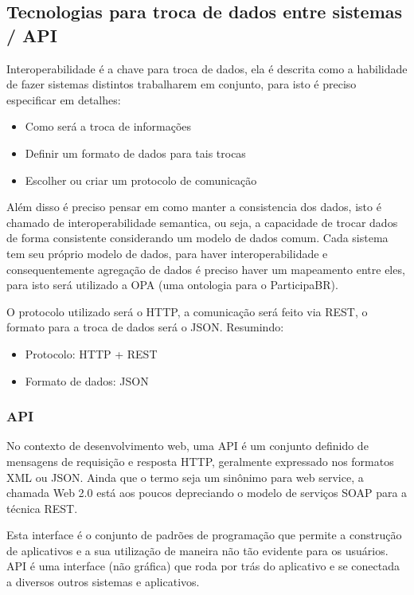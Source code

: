\documentclass[12pt]{article}
\begin{document}
\subsection{Tecnologias para troca de dados entre sistemas / API}

Interoperabilidade é a chave para troca de dados, ela é descrita como a
habilidade de fazer sistemas distintos trabalharem em conjunto, para isto é
preciso especificar em detalhes:

\begin{itemize}
  \item Como será a troca de informações
  \item Definir um formato de dados para tais trocas
  \item Escolher ou criar um protocolo de comunicação
\end{itemize}

Além disso é preciso pensar em como manter a consistencia dos dados, isto é
chamado de interoperabilidade semantica, ou seja, a capacidade de trocar dados
de forma consistente considerando um modelo de dados comum. Cada sistema tem
seu próprio modelo de dados, para haver interoperabilidade e consequentemente
agregação de dados é preciso haver um mapeamento entre eles, para isto será
utilizado a OPA (uma ontologia para o ParticipaBR).

O protocolo utilizado será o HTTP, a comunicação será feito via REST,
o formato para a troca de dados será o JSON\cite{json}. Resumindo:

\begin{itemize}
  \item Protocolo: HTTP + REST
  \item Formato de dados: JSON
\end{itemize}

\subsubsection{API}

No contexto de desenvolvimento web, uma API é um conjunto definido de
mensagens de requisição e resposta HTTP, geralmente expressado nos formatos
XML ou JSON. Ainda que o termo seja um sinônimo para web service, a chamada Web
2.0 está aos poucos depreciando o modelo de serviços SOAP para a técnica REST.

Esta interface é o conjunto de padrões de programação que permite a construção
de aplicativos e a sua utilização de maneira não tão evidente para os
usuários. API é uma interface (não gráfica) que roda por trás do aplicativo e
se conectada a diversos outros sistemas e aplicativos.
\end{document}
